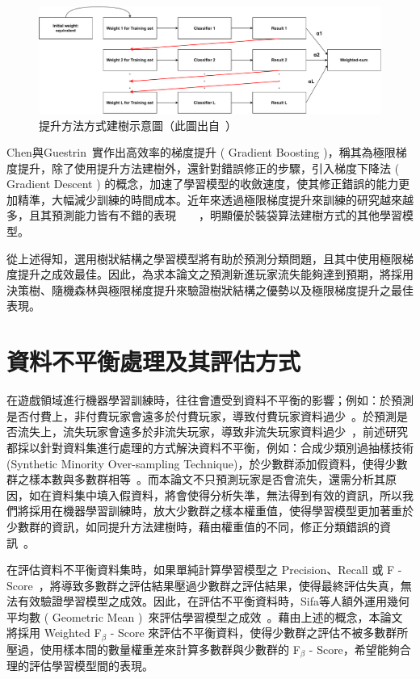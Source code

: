 \begin{figure}[!htb]
    \begin{center}
      \includegraphics[width=1\textwidth]{figures/Image_Boosting.pdf}
      \caption[提升方法方式建樹示意圖]{提升方法方式建樹示意圖（此圖出自~\cite{tommy2018baggingandboosting}）}
      \label{fig:Boosting}
    \end{center}
\end{figure}

Chen與Guestrin~\cite{chen2016xgboost}實作出高效率的梯度提升 ( Gradient Boosting )，稱其為極限梯度提升，除了使用提升方法建樹外，還針對錯誤修正的步驟，引入梯度下降法 ( Gradient Descent ) 的概念，加速了學習模型的收斂速度，使其修正錯誤的能力更加精準，大幅減少訓練的時間成本。近年來透過極限梯度提升來訓練的研究越來越多，且其預測能力皆有不錯的表現~\cite{XGBoostTemporalData}~\cite{martinez2020machine}~\cite{semenov2016performance}~\cite{janusz2017helping}，明顯優於裝袋算法建樹方式的其他學習模型。

從上述得知，選用樹狀結構之學習模型將有助於預測分類問題，且其中使用極限梯度提升之成效最佳。因此，為求本論文之預測新進玩家流失能夠達到預期，將採用決策樹、隨機森林與極限梯度提升來驗證樹狀結構之優勢以及極限梯度提升之最佳表現。

\section{資料不平衡處理及其評估方式}

在遊戲領域進行機器學習訓練時，往往會遭受到資料不平衡的影響；例如：於預測是否付費上，非付費玩家會遠多於付費玩家，導致付費玩家資料過少~\cite{sifa2015predicting}。於預測是否流失上，流失玩家會遠多於非流失玩家，導致非流失玩家資料過少~\cite{lee2016predicting}，前述研究都採以針對資料集進行處理的方式解決資料不平衡，例如：合成少類別過抽樣技術 (Synthetic Minority Over-sampling Technique)，於少數群添加假資料，使得少數群之樣本數與多數群相等~\cite{chawla2002smote}。而本論文不只預測玩家是否會流失，還需分析其原因，如在資料集中填入假資料，將會使得分析失準，無法得到有效的資訊，所以我們將採用在機器學習訓練時，放大少數群之樣本權重值，使得學習模型更加著重於少數群的資訊，如同提升方法建樹時，藉由權重值的不同，修正分類錯誤的資訊~\cite{freund1999short}。

在評估資料不平衡資料集時，如果單純計算學習模型之 Precision、Recall 或 F - Score~\cite{chinchor1993muc}，將導致多數群之評估結果壓過少數群之評估結果，使得最終評估失真，無法有效驗證學習模型之成效。因此，在評估不平衡資料時，Sifa等人額外運用幾何平均數 ( Geometric Mean )~\cite{kubat1997learning}來評估學習模型之成效~\cite{sifa2015predicting}。藉由上述的概念，本論文將採用 Weighted F$_{\beta}$ - Score 來評估不平衡資料，使得少數群之評估不被多數群所壓過，使用樣本間的數量權重差來計算多數群與少數群的 F$_{\beta}$ - Score，希望能夠合理的評估學習模型間的表現。
